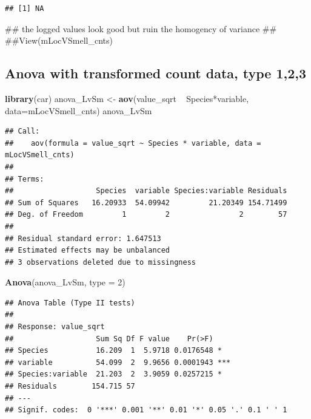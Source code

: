 \documentclass[]{article}
\newenvironment{Shaded}{\begin{snugshade}}{\end{snugshade}}
\newcommand{\KeywordTok}[1]{\textcolor[rgb]{0.13,0.29,0.53}{\textbf{{#1}}}}
\newcommand{\DataTypeTok}[1]{\textcolor[rgb]{0.13,0.29,0.53}{{#1}}}
\newcommand{\DecValTok}[1]{\textcolor[rgb]{0.00,0.00,0.81}{{#1}}}
\newcommand{\StringTok}[1]{\textcolor[rgb]{0.31,0.60,0.02}{{#1}}}
\newcommand{\NormalTok}[1]{{#1}}
\begin{document}
\begin{verbatim}
## [1] NA
\end{verbatim}

\begin{Shaded}
\begin{Highlighting}[]
\NormalTok{## the logged values look good but ruin the homogency of variance}
\NormalTok{## }
\NormalTok{##View(mLocVSmell_cnts)}
\end{Highlighting}
\end{Shaded}

\subsection{Anova with transformed count data, type
1,2,3}\label{anova-with-transformed-count-data-type-123}

\begin{Shaded}
\begin{Highlighting}[]
\KeywordTok{library}\NormalTok{(car)}
\NormalTok{anova_LvSm <-}\StringTok{ }\KeywordTok{aov}\NormalTok{(value_sqrt ~}\StringTok{ }\NormalTok{Species*variable, }\DataTypeTok{data=}\NormalTok{mLocVSmell_cnts)}
\NormalTok{anova_LvSm}
\end{Highlighting}
\end{Shaded}

\begin{verbatim}
## Call:
##    aov(formula = value_sqrt ~ Species * variable, data = mLocVSmell_cnts)
## 
## Terms:
##                   Species  variable Species:variable Residuals
## Sum of Squares   16.20933  54.09942         21.20349 154.71499
## Deg. of Freedom         1         2                2        57
## 
## Residual standard error: 1.647513
## Estimated effects may be unbalanced
## 3 observations deleted due to missingness
\end{verbatim}

\begin{Shaded}
\begin{Highlighting}[]
\KeywordTok{Anova}\NormalTok{(anova_LvSm, }\DataTypeTok{type =} \DecValTok{2}\NormalTok{)}
\end{Highlighting}
\end{Shaded}

\begin{verbatim}
## Anova Table (Type II tests)
## 
## Response: value_sqrt
##                   Sum Sq Df F value    Pr(>F)    
## Species           16.209  1  5.9718 0.0176548 *  
## variable          54.099  2  9.9656 0.0001943 ***
## Species:variable  21.203  2  3.9059 0.0257215 *  
## Residuals        154.715 57                      
## ---
## Signif. codes:  0 '***' 0.001 '**' 0.01 '*' 0.05 '.' 0.1 ' ' 1
\end{verbatim}
\end{document}
